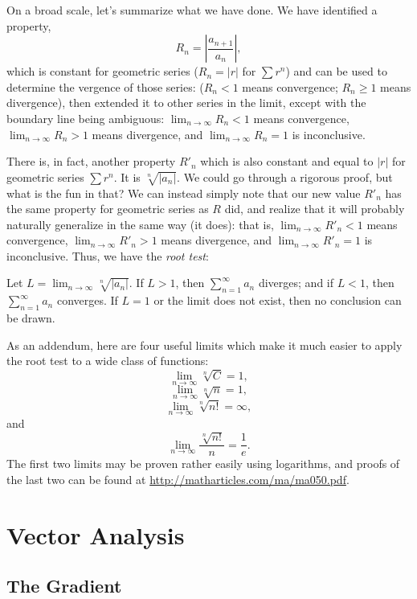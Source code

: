 \documentclass{myarticle}
\theoremstyle{nospace}
\newtheorem{old series theorem}{Theorem}
\newenvironment{series theorem}{\begin{mdframed}\begin{old series theorem}}{\end{old series theorem}\end{mdframed}}
\begin{document}
On a broad scale, let's summarize what we have done. We have identified a property, \[ R_n = \left|\frac{a_{n+1}}{a_n}\right|, \] which is constant for geometric series ($R_n = |r|$ for $\sum r^n$) and can be used to determine the vergence of those series: ($R_n < 1$ means convergence; $R_n \geq 1$ means divergence), then extended it to other series in the limit, except with the boundary line being ambiguous: $\lim_{n \to \infty} R_n < 1$ means convergence, $\lim_{n \to \infty} R_n > 1$ means divergence, and $\lim_{n \to \infty} R_n = 1$ is inconclusive.

There is, in fact, another property $R'_n$ which is also constant and equal to $|r|$ for geometric series $\sum r^n$. It is $\sqrt[n]{|a_n|}$. We could go through a rigorous proof, but what is the fun in that? We can instead simply note that our new value $R'_n$ has the same property for geometric series as $R$ did, and realize that it will probably naturally generalize in the same way (it does): that is, $\lim_{n \to \infty} R'_n < 1$ means convergence, $\lim_{n \to \infty} R'_n > 1$ means divergence, and $\lim_{n \to \infty} R'_n = 1$ is inconclusive. Thus, we have the \emph{root test}:

\begin{series theorem} Let $L = \lim_{n \to \infty} \sqrt[n]{|a_n|}$. If $L > 1$, then $\sum_{n=1}^\infty a_n$ diverges; and if $L < 1$, then $\sum_{n=1}^\infty a_n$ converges. If $L = 1$ or the limit does not exist, then no conclusion can be drawn. \end{series theorem}

As an addendum, here are four useful limits which make it much easier to apply the root test to a wide class of functions: \[ \lim_{n \to \infty} \sqrt[n]{C} = 1, \] \[ \lim_{n \to \infty} \sqrt[n]{n} = 1, \] \[ \lim_{n \to \infty} \sqrt[n]{n!} = \infty, \] and \[ \lim_{n \to \infty} \frac{\sqrt[n]{n!}}{n} = \frac{1}{e}. \] The first two limits may be proven rather easily using logarithms, and proofs of the last two can be found at \url{http://matharticles.com/ma/ma050.pdf}.

\section{Vector Analysis} \label{sec:vector analysis}

\subsection{The Gradient} \label{sec:gradient}
\end{document}
